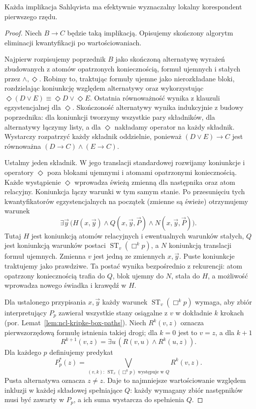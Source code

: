 \begin{twierdzenie}
\label{thm:ncl-kripke-sahlqvist-implication-correspondence}
Każda implikacja Sahlqvista ma efektywnie
wyznaczalny lokalny korespondent pierwszego
rzędu.
\end{twierdzenie}
\begin{proof}
Niech $B\to C$ będzie taką implikacją.
Opisujemy skończony algorytm eliminacji
kwantyfikacji po wartościowaniach.

Najpierw rozpisujemy poprzednik $B$ jako
skończoną alternatywę wyrażeń zbudowanych
z atomów opatrzonych koniecznością,
formuł ujemnych i stałych przez
$\wedge,\Diamond$. Robimy to, traktując
formuły ujemne jako nierozkładane bloki,
rozdzielając koniunkcję względem alternatywy
oraz wykorzystując
$\Diamond(D\vee E)\equiv\Diamond D\vee\Diamond E$.
Ostatnia równoważność wynika z klauzuli
egzystencjalnej dla $\Diamond$.
Skończoność alternatywy wynika indukcyjnie
z budowy poprzednika: dla koniunkcji
tworzymy wszystkie pary składników,
dla alternatywy łączymy listy, a dla
$\Diamond$ nakładamy operator na każdy
składnik. Wystarczy rozpatrzyć każdy
składnik oddzielnie, ponieważ
$(D\vee E)\to C$ jest równoważna
$(D\to C)\wedge(E\to C)$.

Ustalmy jeden składnik. W jego translacji
standardowej rozwijamy koniunkcje i operatory
$\Diamond$ poza blokami ujemnymi i atomami
opatrzonymi koniecznością. Każde wystąpienie
$\Diamond$ wprowadza świeżą zmienną dla
następnika oraz atom relacyjny.
Koniunkcja łączy warunki w tym samym
stanie. Po przesunięciu tych kwantyfikatorów
egzystencjalnych na początek (zmienne
są świeże) otrzymujemy warunek
\[
 \exists\vec y\,\bigl(H(x,\vec y)
                  \wedge Q(x,\vec y,\vec P)
                  \wedge N(x,\vec y,\vec P)\bigr).
\]
Tutaj $H$ jest koniunkcją atomów relacyjnych
i ewentualnych warunków stałych,
$Q$ jest koniunkcją warunków postaci
$\operatorname{ST}_v(\Box^k p)$,
a $N$ koniunkcją translacji formuł ujemnych.
Zmienna $v$ jest jedną ze zmiennych
$x,\vec y$. Puste koniunkcje traktujemy
jako prawdziwe.
Ta postać wynika bezpośrednio z rekurencji:
atom opatrzony koniecznością trafia do $Q$,
blok ujemny do $N$, stała do $H$,
a możliwość wprowadza nowego świadka
i krawędź w $H$.

Dla ustalonego przypisania $x,\vec y$
każdy warunek $\operatorname{ST}_v(\Box^k p)$
wymaga, aby zbiór interpretujący $P_p$ zawierał
wszystkie stany
osiągalne z $v$ w dokładnie $k$ krokach
(por. Lemat~\ref{lem:ncl-kripke-box-paths}).
Niech $R^k(v,z)$ oznacza pierwszorzędową
formułę istnienia takiej drogi; dla $k=0$
jest to $v=z$, a dla $k+1$
\[
 R^{k+1}(v,z)=\exists u\,(R(v,u)\wedge R^k(u,z)).
\]
Dla każdego $p$ definiujemy predykat
\[
 P_p^*(z)=
 \bigvee_{(v,k):\,\operatorname{ST}_v(\Box^k p)
                       \text{ występuje w }Q}
             R^k(v,z).
\]
Pusta alternatywa oznacza $z\ne z$.
Daje to najmniejsze wartościowanie względem inkluzji w każdej składowej
spełniające $Q$: każdy wymagany zbiór
następników musi być zawarty w $P_p$,
a ich suma wystarcza do spełnienia $Q$.


\end{proof}
